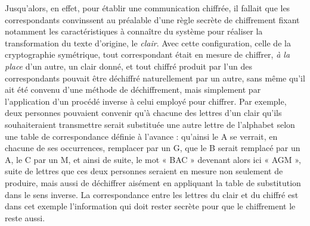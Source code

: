 Jusqu’alors, en effet, pour établir une communication chiffrée, il fallait que les correspondants
convinssent au préalable d’une règle secrète de chiffrement fixant notamment les caractéristiques
à connaître du système pour réaliser la transformation du texte d’origine, le \emph{clair}.
Avec cette configuration, celle de la cryptographie symétrique, tout correspondant était en mesure
de chiffrer, \emph{à la place} d’un autre, un clair donné, et tout chiffré produit par l’un des
correspondants pouvait être déchiffré naturellement par un autre, sans même qu’il ait été convenu
d’une méthode de déchiffrement, mais simplement par l’application d’un procédé inverse à celui
employé pour chiffrer.
Par exemple, deux personnes pouvaient convenir qu’à chacune des lettres d’un clair qu’ils
souhaiteraient transmettre serait substituée une autre lettre de l’alphabet selon une table de
correspondance définie à l’avance : qu’ainsi le A se verrait, en chacune de ses occurrences,
remplacer par un G, que le B serait remplacé par un A, le C par un M,
et ainsi de suite, le mot « BAC » devenant alors ici « AGM », suite
de lettres que ces deux personnes seraient en mesure non seulement de produire, mais aussi de
déchiffrer aisément en appliquant la table de substitution dans le sens inverse.
La correspondance entre les lettres du clair et du chiffré est dans cet exemple l’information qui
doit rester secrète pour que le chiffrement le reste aussi.

